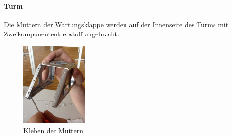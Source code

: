 \paragraph{Turm}
Die Muttern der Wartungsklappe werden auf der Innenseite des Turms mit 
Zweikomponentenklebstoff angebracht. 

\begin{figure}[h!]
	\centering
	\includegraphics[width=0.3\textwidth]{fig/IMG_2292.JPG}
	\caption{Kleben der Muttern}
	\label{fig:Muttern Kleben}
\end{figure}
\FloatBarrier

